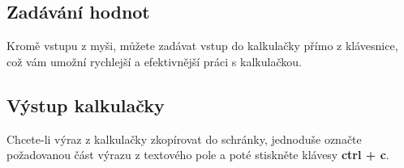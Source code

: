 \documentclass[a4paper, 11pt]{article}
\begin{document}
    \subsection*{Zadávání hodnot}
    Kromě vstupu z myši, můžete zadávat vstup do kalkulačky přímo z klávesnice, což vám umožní rychlejší a efektivnější práci s kalkulačkou. 
    \subsection*{Výstup kalkulačky}
    Chcete-li výraz z kalkulačky zkopírovat do schránky, jednoduše označte požadovanou část výrazu z textového pole a poté stiskněte klávesy \textbf{ctrl + c}.
\end{document}
